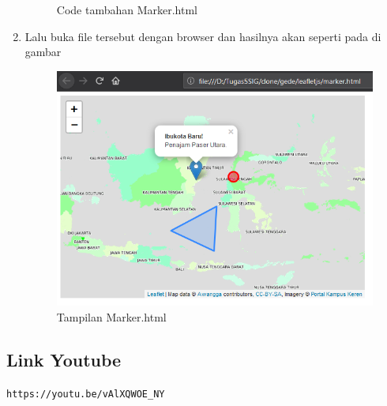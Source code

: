 \begin{enumerate}
\begin{figure}[H]
		\centering
		\caption{Code tambahan Marker.html}
	\end{figure}
    \item Lalu buka file tersebut dengan browser dan hasilnya akan seperti pada di gambar
    \hfill\break
    \begin{figure}[H]
		\includegraphics[width=12cm]{figures/Tugas5/1174077/5.png}
		\centering
		\caption{Tampilan Marker.html}
	\end{figure}
\end{enumerate}
\subsection{Link Youtube}
\verb|https://youtu.be/vAlXQWOE_NY|